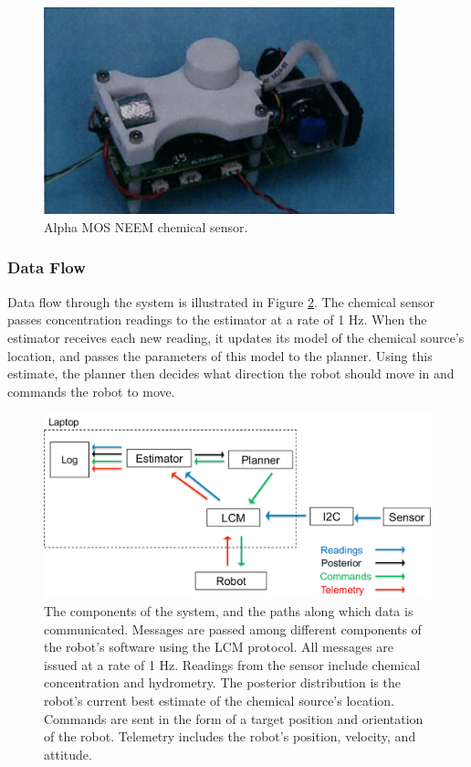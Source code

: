 \documentclass[submit]{aiaa-pretty-modified}
\begin{document}
\begin{figure}
\begin{center}
\includegraphics[width=4in]{img/sensor.pdf}
\caption{Alpha MOS NEEM chemical sensor.}
\label{fig:sensor}
\end{center}
\end{figure}

\label{sec:mount}

\subsubsection{Data Flow}

Data flow through the system is illustrated in Figure \ref{fig:acquisition}. The
chemical sensor passes concentration readings to the estimator at a rate of 1
Hz. When the estimator receives each new reading, it updates its model of the
chemical source's location, and passes the
parameters of this model to the planner. Using this estimate, the planner then
decides what direction the robot should move in and commands the robot to move.

\begin{figure}
\begin{center}
\includegraphics[width=6in]{img/acquisition.pdf}
\caption{The components of the system, and the paths along which data is
  communicated. Messages are passed among different components of the robot's
  software using the LCM protocol. All messages are issued at a rate of 1 Hz.
  Readings from the sensor include chemical concentration and hydrometry. The
  posterior distribution is the robot's current best estimate of the chemical
  source's location. Commands are sent in the form of a target position and
  orientation of the robot. Telemetry includes the robot's position, velocity,
  and attitude.}
\label{fig:acquisition}
\end{center}
\end{figure}
\end{document}
